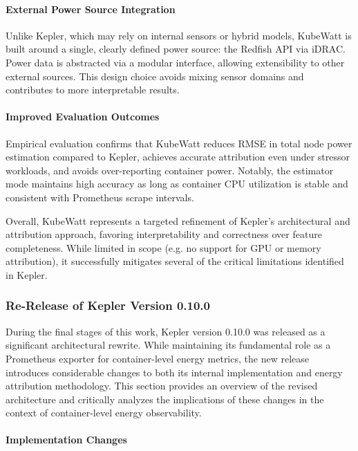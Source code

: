 \paragraph{External Power Source Integration}
Unlike Kepler, which may rely on internal sensors or hybrid models, KubeWatt is built around a single, clearly defined power source: the Redfish API via iDRAC. Power data is abstracted via a modular interface, allowing extensibility to other external sources. This design choice avoids mixing sensor domains and contributes to more interpretable results.

\paragraph{Improved Evaluation Outcomes}
Empirical evaluation confirms that KubeWatt reduces RMSE in total node power estimation compared to Kepler, achieves accurate attribution even under stressor workloads, and avoids over-reporting container power. Notably, the estimator mode maintains high accuracy as long as container CPU utilization is stable and consistent with Prometheus scrape intervals.

Overall, KubeWatt represents a targeted refinement of Kepler's architectural and attribution approach, favoring interpretability and correctness over feature completeness. While limited in scope (e.g. no support for GPU or memory attribution), it successfully mitigates several of the critical limitations identified in Kepler.

\subsubsection{Re-Release of Kepler Version 0.10.0}
\label{sec:kepler-0.10}

During the final stages of this work, Kepler version 0.10.0 was released as a significant architectural rewrite. While maintaining its fundamental role as a Prometheus exporter for container-level energy metrics, the new release introduces considerable changes to both its internal implementation and energy attribution methodology. This section provides an overview of the revised architecture and critically analyzes the implications of these changes in the context of container-level energy observability.

\paragraph{Implementation Changes}

